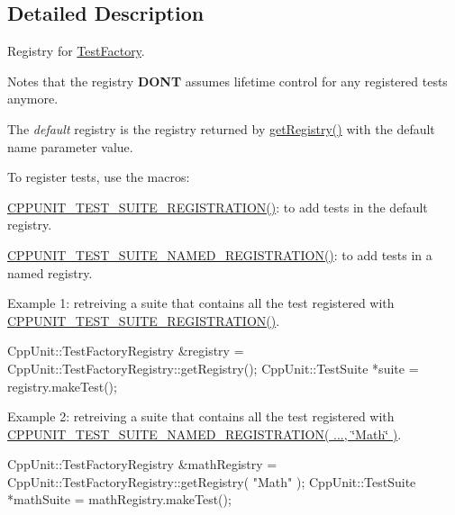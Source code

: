 \subsection{Detailed Description}
Registry for \hyperlink{class_test_factory}{Test\+Factory}.

Notes that the registry {\bfseries D\+ON\textquotesingle{}T} assumes lifetime control for any registered tests anymore. 

The {\itshape default} registry is the registry returned by \hyperlink{class_test_factory_registry_a1331b28bb1a8bc3db6b8e5ec994ef4ab}{get\+Registry()} with the default name parameter value.

To register tests, use the macros\+:
\begin{DoxyItemize}
\item \hyperlink{_helper_macros_8h_a70f00cc9f589d24019ee9efee4de2d74}{C\+P\+P\+U\+N\+I\+T\+\_\+\+T\+E\+S\+T\+\_\+\+S\+U\+I\+T\+E\+\_\+\+R\+E\+G\+I\+S\+T\+R\+A\+T\+I\+O\+N()}\+: to add tests in the default registry.
\item \hyperlink{_helper_macros_8h_a028a5855a40ad3836e2a26aa48cd4c91}{C\+P\+P\+U\+N\+I\+T\+\_\+\+T\+E\+S\+T\+\_\+\+S\+U\+I\+T\+E\+\_\+\+N\+A\+M\+E\+D\+\_\+\+R\+E\+G\+I\+S\+T\+R\+A\+T\+I\+O\+N()}\+: to add tests in a named registry.
\end{DoxyItemize}

Example 1\+: retreiving a suite that contains all the test registered with \hyperlink{_helper_macros_8h_a70f00cc9f589d24019ee9efee4de2d74}{C\+P\+P\+U\+N\+I\+T\+\_\+\+T\+E\+S\+T\+\_\+\+S\+U\+I\+T\+E\+\_\+\+R\+E\+G\+I\+S\+T\+R\+A\+T\+I\+O\+N()}. 
\begin{DoxyCode}
CppUnit::TestFactoryRegistry &registry = CppUnit::TestFactoryRegistry::getRegistry();
CppUnit::TestSuite *suite = registry.makeTest();
\end{DoxyCode}


Example 2\+: retreiving a suite that contains all the test registered with \hyperlink{_helper_macros_8h_a028a5855a40ad3836e2a26aa48cd4c91}{C\+P\+P\+U\+N\+I\+T\+\_\+\+T\+E\+S\+T\+\_\+\+S\+U\+I\+T\+E\+\_\+\+N\+A\+M\+E\+D\+\_\+\+R\+E\+G\+I\+S\+T\+R\+A\+T\+I\+ON( ..., \char`\"{}\+Math\char`\"{} )}. 
\begin{DoxyCode}
CppUnit::TestFactoryRegistry &mathRegistry = CppUnit::TestFactoryRegistry::getRegistry( \textcolor{stringliteral}{"Math"} );
CppUnit::TestSuite *mathSuite = mathRegistry.makeTest();
\end{DoxyCode}


